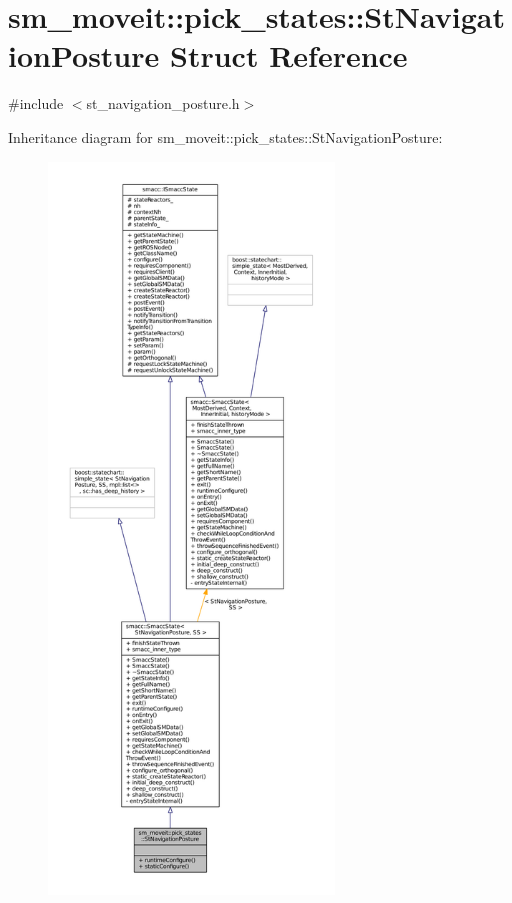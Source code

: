 \hypertarget{structsm__moveit_1_1pick__states_1_1StNavigationPosture}{}\section{sm\+\_\+moveit\+:\+:pick\+\_\+states\+:\+:St\+Navigation\+Posture Struct Reference}
\label{structsm__moveit_1_1pick__states_1_1StNavigationPosture}


{\ttfamily \#include $<$st\+\_\+navigation\+\_\+posture.\+h$>$}



Inheritance diagram for sm\+\_\+moveit\+:\+:pick\+\_\+states\+:\+:St\+Navigation\+Posture\+:
\nopagebreak
\begin{figure}[H]
\begin{center}
\leavevmode
\includegraphics[height=550pt]{structsm__moveit_1_1pick__states_1_1StNavigationPosture__inherit__graph}
\end{center}
\end{figure}


